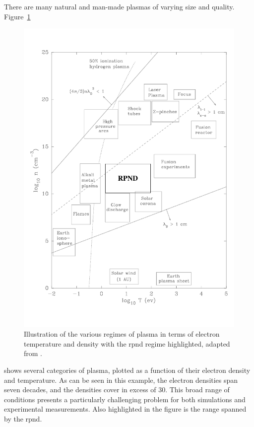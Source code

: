 There are many natural and man-made plasmas of varying size and quality.
Figure~\ref{fig:regimes}
\begin{figure}
  \centering
  \includegraphics{./chapters/theory/figures/regimes.pdf}
  \caption{Illustration of the various regimes of plasma in terms of
    electron temperature and density with the \acs{rpnd} regime highlighted,
    adapted from \cite{Huba2011}.}
  \label{fig:regimes}
\end{figure}
shows several categories of plasma, plotted as a function of their electron
density and temperature. As can be seen in this example, the electron densities
span seven decades, and the densities cover in excess of 30. This broad range of
conditions presents a particularly challenging problem for both simulations and
experimental measurements. Also highlighted in the figure is the range spanned
by the \acs{rpnd}.

